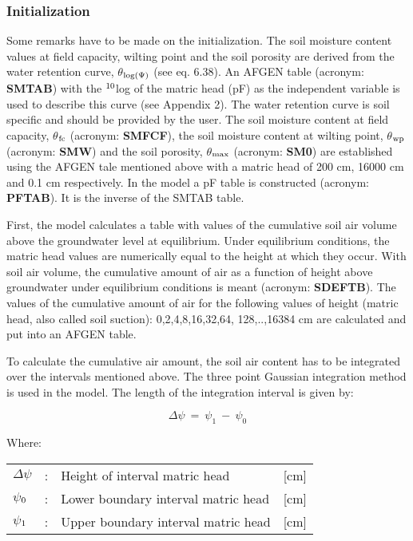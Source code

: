 \subsubsection{Initialization}
Some remarks have to be made on the initialization. The soil moisture content values at
field capacity, wilting point and the soil porosity are derived from the water retention
curve, $\theta$$_{{\rm log(}{\rm \Psi}{)}}$ (see eq. 6.38). An AFGEN table (acronym: 
{\bf SMTAB}) with the $^{{\rm 10}}$log of the
matric head (pF) as the independent variable is used to describe this curve (see Appendix
2). The water retention curve is soil specific and should be provided by the user. The soil
moisture content at field capacity, {\bf $\theta$$_{{\rm fc}}$} (acronym: {\bf SMFCF}), 
the soil moisture content at
wilting point, {\bf $\theta$$_{{\rm wp}}$} (acronym: {\bf SMW}) and the soil porosity, 
{\bf $\theta$$_{{\rm max}}$} (acronym: {\bf SM0}) are
established using the AFGEN tale mentioned above with a matric head of 200 cm, 16000
cm and 0.1 cm respectively. In the model a pF table is constructed (acronym: {\bf PFTAB}).
It is the inverse of the SMTAB table.

First, the model calculates a table with values of the cumulative soil air volume above the
groundwater level at equilibrium. Under equilibrium conditions, the matric head values
are numerically equal to the height at which they occur. With soil air volume, the
cumulative amount of air as a function of height above groundwater under equilibrium
conditions is meant (acronym: {\bf SDEFTB}). The values of the cumulative amount of air for
the following values of height (matric head, also called soil suction): 0,2,4,8,16,32,64,
128,..,16384 cm are calculated and put into an AFGEN table. 

To calculate the cumulative air amount, the soil air content has to be integrated over the
intervals mentioned above. The three point Gaussian integration method is used in the
model. The length of the integration interval is given by:

\begin{equation}
\Delta  \psi ~=~ \psi _{1} ~-~ \psi _{0} 
\end{equation}

Where:\\[5pt]
\begin{tabularx}{\textwidth}{llXr}
$\Delta$$\psi$ &:& Height of interval matric head  & [cm]\\
$\psi$$_{{\rm 0}}$ &:& Lower boundary interval matric head  & [cm]\\
$\psi$$_{{\rm 1}}$ &:& Upper boundary interval matric head  & [cm]\\
\end{tabularx}

